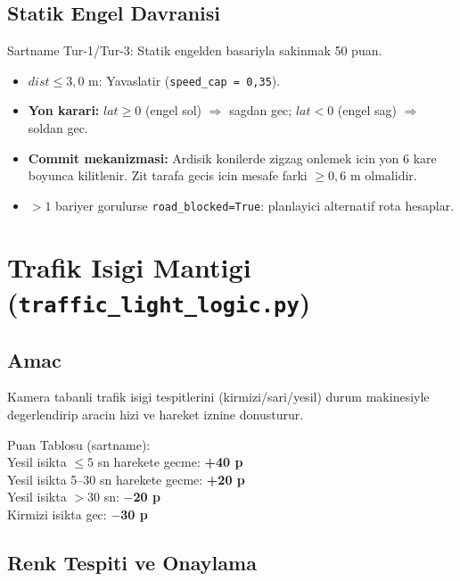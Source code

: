 \documentclass[a4paper,12pt]{article}
\begin{document}
\subsection{Statik Engel Davranisi}

\begin{specbox}
Sartname Tur-1/Tur-3: Statik engelden basariyla sakinmak 50 puan.
\end{specbox}

\begin{itemize}
  \item $dist \leq 3{,}0$ m: Yavaslatir (\texttt{speed\_cap = 0{,}35}).
  \item \textbf{Yon karari:} $lat \geq 0$ (engel sol) $\Rightarrow$ sagdan
        gec; $lat < 0$ (engel sag) $\Rightarrow$ soldan gec.
  \item \textbf{Commit mekanizmasi:} Ardisik konilerde zigzag onlemek icin yon
        6 kare boyunca kilitlenir. Zit tarafa gecis icin mesafe farki
        $\geq 0{,}6$ m olmalidir.
  \item $> 1$ bariyer gorulurse \texttt{road\_blocked=True}: planlayici
        alternatif rota hesaplar.
\end{itemize}

\section{Trafik Isigi Mantigi (\texttt{traffic\_light\_logic.py})}

\subsection{Amac}

Kamera tabanli trafik isigi tespitlerini (kirmizi/sari/yesil) durum
makinesiyle degerlendirip aracin hizi ve hareket iznine donusturur.

\begin{specbox}
Puan Tablosu (sartname):\\
Yesil isikta $\leq 5$ sn harekete gecme: \textbf{+40 p}\\
Yesil isikta 5--30 sn harekete gecme: \textbf{+20 p}\\
Yesil isikta $>30$ sn: \textbf{$-$20 p}\\
Kirmizi isikta gec: \textbf{$-$30 p}
\end{specbox}

\subsection{Renk Tespiti ve Onaylama}
\end{document}
